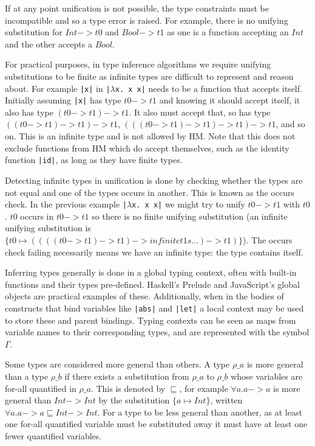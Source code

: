 \documentclass[a4paper,fleqn,12pt]{article}
\begin{document}
If at any point unification is not possible, the type constraints must be incompatible and so a type error is raised. For example, there is no unifying substitution for $Int -> t0$ and $Bool -> t1$ as one is a function accepting an $Int$ and the other accepts a $Bool$.

For practical purposes, in type inference algorithms we require unifying substitutions to be finite as infinite types are difficult to represent and reason about. For example \texttt{|x|} in \texttt{|$\lambda$x. x x|} needs to be a function that accepts itself. Initially assuming \texttt{|x|} has type $t0 -> t1$ and knowing it should accept itself, it also has type $(t0 -> t1) -> t1$. It also must accept that, so has type $((t0 -> t1) -> t1) -> t1$, $(((t0 -> t1) -> t1) -> t1) -> t1$, and so on. This is an infinite type and is not allowed by HM. Note that this does not exclude functions from HM which do accept themselves, such as the identity function \texttt{|id|}, as long as they have finite types.

Detecting infinite types in unification is done by checking whether the types are not equal and one of the types occurs in another. This is known as the occurs check. In the previous example \texttt{|$\lambda$x. x x|} we might try to unify $t0 -> t1$ with $t0$. $t0$ occurs in $t0 -> t1$ so there is no finite unifying substitution (an infinite unifying substitution is $\{ t0 \mapsto ((((t0 -> t1) -> t1) -> infinite t1s…) -> t1) \}$). The occurs check failing necessarily means we have an infinite type: the type contains itself.

Inferring types generally is done in a global typing context, often with built-in functions and their types pre-defined. Haskell’s Prelude and JavaScript’s global objects are practical examples of these. Additionally, when in the bodies of constructs that bind variables like \texttt{|abs|} and \texttt{|let|} a local context may be used to store these and parent bindings. Typing contexts can be seen as maps from variable names to their corresponding types, and are represented with the symbol $\Gamma$.

Some types are considered more general than others. A type $\rho\_a$ is more general than a type $\rho\_b$ if there exists a substitution from $\rho\_a$ to $\rho\_b$ whose variables are for-all quantified in $\rho\_a$. This is denoted by $\sqsubseteq$, for example $\forall a. a -> a$ is more general than $Int -> Int$ by the substitution $\{ a \mapsto Int \}$, written $\forall a. a -> a \sqsubseteq Int -> Int$. For a type to be less general than another, as at least one for-all quantified variable must be substituted away it must have at least one fewer quantified variables.
\end{document}
